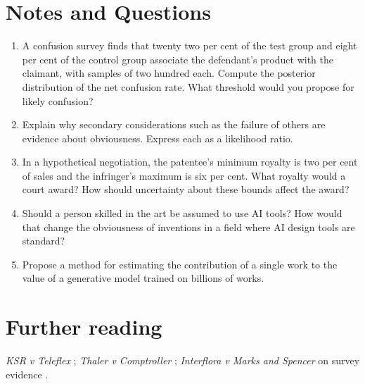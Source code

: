 \section*{Notes and Questions}
\begin{enumerate}[label=\arabic*.]
\item A confusion survey finds that twenty two per cent of the test group and eight per cent of the control group associate the defendant's product with the claimant, with samples of two hundred each. Compute the posterior distribution of the net confusion rate. What threshold would you propose for likely confusion?
\item Explain why secondary considerations such as the failure of others are evidence about obviousness. Express each as a likelihood ratio.
\item In a hypothetical negotiation, the patentee's minimum royalty is two per cent of sales and the infringer's maximum is six per cent. What royalty would a court award? How should uncertainty about these bounds affect the award?
\item Should a person skilled in the art be assumed to use AI tools? How would that change the obviousness of inventions in a field where AI design tools are standard?
\item Propose a method for estimating the contribution of a single work to the value of a generative model trained on billions of works.
\end{enumerate}

\section*{Further reading}
\emph{KSR v Teleflex} \citep{ksr2007}; \emph{Thaler v Comptroller} \citep{thaler2023}; \emph{Interflora v Marks and Spencer} on survey evidence \citep{interflora2012,interflora2013}.
